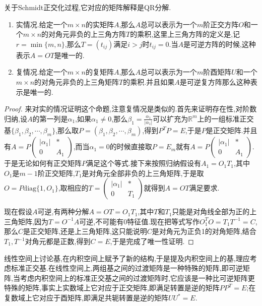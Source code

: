关于Schmidt正交化过程,它对应的矩阵解释是QR分解.
\begin{enumerate}
	\item 实情况.给定一个$m\times n$的实矩阵$A$,那么$A$总可以表示为一个$m$阶正交方阵$O$和一个$m\times n$的对角元非负的上三角方阵$T$的乘积,这里上三角方阵的定义是,记$r=\min\{m,n\}$,那么$T=(t_{ij})$满足$i>j$时$t_{ij}=0$.当$A$是可逆方阵的时候,这种表示$A=OT$是唯一的.
	\item 复情况.给定一个$m\times n$的复矩阵$A$,那么$A$总可以表示为一个$m$阶酉矩阵$U$和一个$m\times n$的对角元非负的上三角矩阵$T$的乘积.并且如果$A$是可逆复方阵那么这种表示是唯一的.
\end{enumerate}
\begin{proof}
	
	来对实的情况证明这个命题,注意复情况是类似的.首先来证明存在性,对阶数归纳,设$A$的第一列是$\alpha_1$,如果$\alpha_1\not=0$,那么$\beta_1=\frac{\alpha_1}{|\alpha_1|}$可以扩充为$\mathbb{R}^m$上的一组标准正交基$\{\beta_1,\beta_2,\cdots,\beta_m\}$,那么取$P=(\beta_1,\beta_2,\cdots,\beta_m)$,得到$P^TP=E$,于是$P$是正交矩阵.并且有$A=P\left(\begin{array}{cc}
	|\alpha_1|&*\\
	0&A_1\end{array}\right)$,而当$\alpha_1=0$的时候直接取$P=E_m$就有$A=P\left(\begin{array}{cc}
	|\alpha_1|&*\\
	0&A_1\end{array}\right)$.于是无论如何有正交矩阵$P$满足这个等式.接下来按照归纳假设有$A_1=O_1T_1$,其中$O_1$是$m-1$阶正交矩阵,$T_1$是对角元全部非负的上三角矩阵,于是取$O=P\mathrm{diag}\{1,O_1\}$,取相应的$T=\left(\begin{array}{cc}
	|\alpha_1|&*\\
	0&T_1\end{array}\right)$就得到$A=OT$满足要求.
	
	现在假设$A$可逆,有两种分解$A=OT=O_1T_1$,其中$T$和$T_1$只能是对角线全部为正的上三角矩阵,因为$T=O^{-1}A$可逆,不可能有0特征值.现在把等式写作$O_1^TO=T_1T^{-1}=C$,那么$C$是正交矩阵,还是上三角矩阵,这只能说明$C$是对角元为正负1的对角矩阵,结合$T_1,T^{-1}$对角元都是正数,得到$C=E$,于是完成了唯一性证明.
	
\end{proof}

线性空间上讨论基,在内积空间上赋予了新的结构,于是提及内积空间上的基,理应考虑标准正交基.在线性空间上,两组基之间的过渡矩阵是一种特殊的矩阵,即可逆矩阵,当考虑内积空间上的标准正交基之间的过渡矩阵时,它应该是一种比可逆矩阵更特殊的矩阵,事实上实数域上它对应于正交矩阵,即满足转置是逆的矩阵$PP^T=E$;在复数域上它对应于酉矩阵,即满足共轭转置是逆的矩阵$UU^*=E$.

